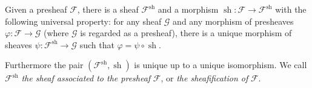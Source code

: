 \documentclass[11pt]{article}
\newcommand{\sh}{\operatorname{sh}}
\begin{document}
\begin{proposition}
    \cite[Proposition II.1.2]{hartsAG}
    Given a presheaf \(\mathscr{F}\), there is a sheaf
    \(\mathscr{F}^{\sh}\) and a morphism
    \(\sh:\mathscr{F}\to\mathscr{F}^{\sh}\)
    with the following universal property: for any sheaf \(\mathscr{G}\)
    and any morphism of presheaves
    \(\varphi:\mathscr{F}\to\mathscr{G}\)
    (where \(\mathscr{G}\) is regarded as a presheaf),
    there is a unique morphism of sheaves
    \(\psi:\mathscr{F}^{\sh}\to\mathscr{G}\)
    such that \(\varphi=\psi\circ\sh\).

    \begin{center}
    \end{center}

    Furthermore the pair \((\mathscr{F}^{\sh},\sh)\)
    is unique up to a unique isomorphism.
    We call \(\mathscr{F}^{\sh}\) \emph{the sheaf associated to the presheaf}
    \(\mathscr{F}\), or \emph{the sheafification of} \(\mathscr{F}\).
\end{proposition}
\end{document}
